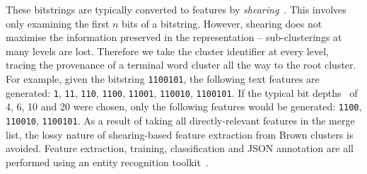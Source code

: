 \documentclass[sigconf]{acmart}
\begin{document}
These bitstrings are typically converted to features by \emph{shearing}~\cite{derczynski2016generalised}.
This involves only examining the first $n$ bits of a bitstring.
However, shearing does not maximise the information preserved in the representation -- sub-clusterings at many levels are lost.
Therefore we take the cluster identifier at every level, tracing the provenance of a terminal word cluster all the way to the root cluster.
For example, given the bitstring {\tt 1100101}, the following text features are generated: {\tt 1}, {\tt 11}, {\tt 110}, {\tt 1100}, {\tt 11001}, {\tt 110010}, {\tt 1100101}.
If the typical bit depths~\cite{ratinov2009design} of 4, 6, 10 and 20 were chosen, only the following features would be generated: {\tt 1100}, {\tt 110010}, {\tt 1100101}.
As a result of taking all directly-relevant features in the merge list, the lossy nature of shearing-based feature extraction from Brown clusters is avoided.
Feature extraction, training, classification and JSON annotation are all performed using an entity recognition toolkit~\cite{derczynski2015usfd}.%
\end{document}
